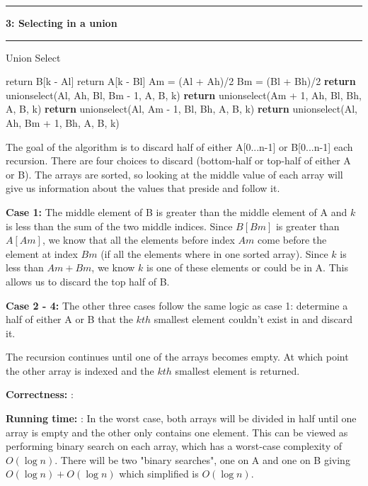 \documentclass[11pt]{article}
\newcommand\question[2]{\vspace{.25in}\hrule\textbf{#1: #2}\vspace{.5em}\hrule\vspace{.10in}}
\newcommand\correctness{\vspace{.10in}\textbf{Correctness: }}
\newcommand\runtime{\vspace{.10in}\textbf{Running time: }}
\begin{document}
\newpage
\question{3}{Selecting in a union}

\begin{algorithm}[H]
\caption{Union Select}
\label{CHalgorithm}
\begin{algorithmic}[1]
\State return B[k - Al]
\EndIf
{}
\State return A[k - Bl]
\EndIf
\newline
\State Am = (Al + Ah)/2 
\State Bm = (Bl + Bh)/2 
\newline
{}
\State \textbf{return} unionselect(Al, Ah, Bl, Bm - 1, A, B, k)
\Else
\State \textbf{return} unionselect(Am + 1, Ah, Bl, Bh, A, B, k)
\EndIf
\Else
{}
\State \textbf{return} unionselect(Al, Am - 1, Bl, Bh, A, B, k)
\Else 
\State \textbf{return} unionselect(Al, Ah, Bm + 1, Bh, A, B, k)
\EndIf

\EndIf
\EndProcedure
\end{algorithmic}
\end{algorithm}

The goal of the algorithm is to discard half of either A[0...n-1] or B[0...n-1] each recursion. There are four choices to discard (bottom-half or top-half of either A or B). The arrays are sorted, so looking at the middle value of each array will give us information about the values that preside and follow it.

\textbf{Case 1:} The middle element of B is greater than the middle element of A and $k$ is less than the sum of the two middle indices. Since $B[Bm]$ is greater than $A[Am]$, we know that all the elements before index $Am$ come before the element at index $Bm$ (if all the elements where in one sorted array). Since $k$ is less than $Am + Bm$, we know $k$ is one of these elements or could be in A. This allows us to discard the top half of B.

\textbf{Case 2 - 4:} The other three cases follow the same logic as case 1: determine a half of either A or B that the $kth$ smallest element couldn't exist in and discard it.

The recursion continues until one of the arrays becomes empty. At which point the other array is indexed and the $kth$ smallest element is returned.

\correctness: 

\runtime: In the worst case, both arrays will be divided in half until one array is empty and the other only contains one element. This can be viewed as performing binary search on each array, which has a worst-case complexity of $O(\log n)$. There will be two "binary searches", one on A and one on B giving $O(\log n) + O(\log n)$ which simplified is $O(\log n)$. 
\end{document}
